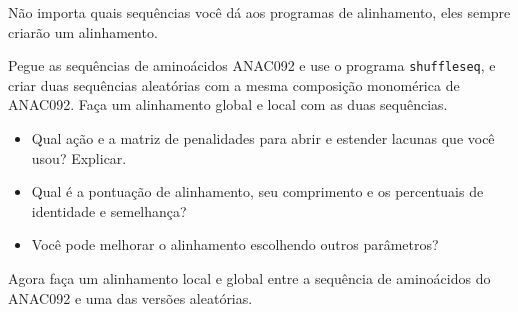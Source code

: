 \documentclass[letter,11pt]{book}
\begin{document}
Não importa quais sequências você dá aos programas de alinhamento, eles sempre criarão um alinhamento.

Pegue as sequências de aminoácidos ANAC092 e use o programa \Verb+shuffleseq+, e criar duas sequências aleatórias com a mesma composição monomérica de ANAC092. Faça um alinhamento global e local com as duas sequências.

{\color{red}
\begin{itemize}
\item Qual ação e a matriz de penalidades para abrir e estender lacunas que você usou? Explicar.
\item Qual é a pontuação de alinhamento, seu comprimento e os percentuais de identidade e semelhança?
\item Você pode melhorar o alinhamento escolhendo outros parâmetros?
\end{itemize}
}

Agora faça um alinhamento local e global entre a sequência de aminoácidos do ANAC092 e uma das versões aleatórias.
\end{document}
